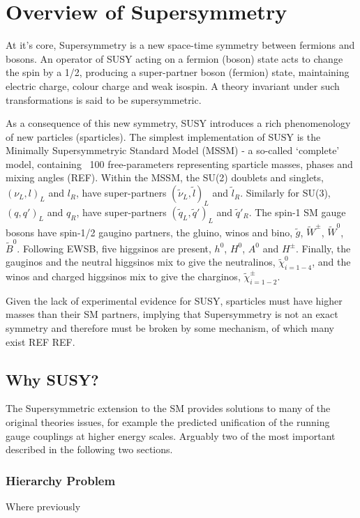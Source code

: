 \section{Overview of Supersymmetry}  %
\label{sec:theory_overview}
At it's core, Supersymmetry is a new space-time symmetry
between fermions and bosons. An operator of SUSY acting on a fermion (boson)
state acts to change the spin by a 1/2, producing a super-partner boson 
(fermion) state, maintaining electric charge, colour charge and weak isospin. A
theory invariant under such transformations is said to be supersymmetric.

As a consequence of this new symmetry, SUSY introduces a rich phenomenology of
new particles (sparticles). The simplest implementation of SUSY is the
Minimally
Supersymmetryic Standard Model (MSSM) - a so-called `complete' model, containing
~100 free-parameters representing sparticle masses, phases and mixing angles 
(REF).
Within the MSSM, the SU(2) doublets and singlets, $(\nu_L, l)_L$ and $l_R$,
have super-partners $(\tilde{\nu}_L, \tilde{l})_L$ and $\tilde{l}_R$. Similarly
for SU(3), $(q, q')_L$ and $q_R$,
have super-partners $(\tilde{q}_L, \tilde{q}')_L$ and $\tilde{q}'_R$. The
spin-1 SM gauge bosons have spin-1/2 gaugino partners, the gluino, winos and
bino, $\tilde{g}$, $\tilde{W}^{\pm}$, $\tilde{W}^0$, $\tilde{B}^0$.
Following EWSB, five higgsinos are present, $h^0$, $H^0$, $A^0$ and
$H^{\pm}$. Finally, the gauginos and the neutral higgsinos mix to give the
neutralinos, $\tilde{\chi}^0_{i=1-4}$, and the winos and charged higgsinos mix
to give the charginos, $\tilde{\chi}^{\pm}_{i=1-2}$.

Given the lack of experimental evidence for SUSY, sparticles must
have higher masses than their SM partners, implying that Supersymmetry is not
an exact symmetry and therefore must be broken by some mechanism, of which many
exist REF REF.



\subsection{Why SUSY?}
The Supersymmetric extension to the SM provides solutions to many of the
original theories issues, for example the predicted unification of the running
gauge couplings at higher energy scales. Arguably two of the most important
described in the following two sections.

\subsubsection{Hierarchy Problem}
Where previously 

